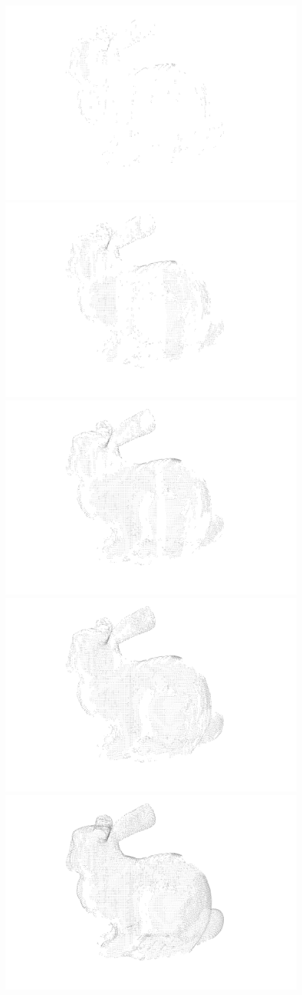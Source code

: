 \documentclass[hyperref, beleg, german, final, twoside]{cgvpub}
\begin{document}
\begin{figure}
	\centering
	\includegraphics[width = .48\linewidth]{images/incrementalLoading/95}%
	\includegraphics[width = .48\linewidth]{images/incrementalLoading/97}
	\includegraphics[width = .48\linewidth]{images/incrementalLoading/99}%
	\includegraphics[width = .48\linewidth]{images/incrementalLoading/101}
	\includegraphics[width = .48\linewidth]{images/incrementalLoading/105}%

\end{figure}
\end{document}
